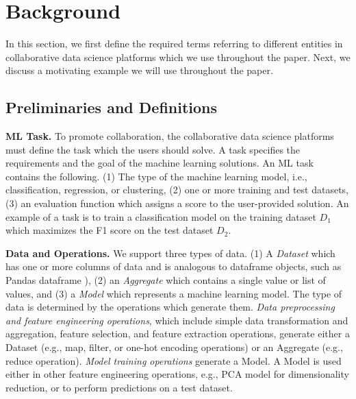 \section{Background} \label{sec-background}
In this section, we first define the required terms referring to different entities in collaborative data science platforms which we use throughout the paper.
Next, we discuss a motivating example we will use throughout the paper.

\subsection{Preliminaries and Definitions}
\textbf{ML Task.} 
To promote collaboration, the collaborative data science platforms must define the task which the users should solve.
A task specifies the requirements and the goal of the machine learning solutions.
An ML task contains the following.
(1) The type of the machine learning model, i.e., classification, regression, or clustering, (2) one or more training and test datasets, (3) an evaluation function which assigns a score to the user-provided solution.
An example of a task is to train a classification model on the training dataset $D_1$ which maximizes the F1 score on the test dataset $D_2$.

\textbf{Data and Operations.}
We support three types of data.
(1) A \textit{Dataset} which has one or more columns of data and is analogous to dataframe objects, such as Pandas dataframe \cite{mckinney-proc-scipy-2010}), (2) an \textit{Aggregate} which contains a single value or list of values, and (3) a \textit{Model} which represents a machine learning model.
The type of data is determined by the operations which generate them.
\textit{Data preprocessing and feature engineering operations}, which include simple data transformation and aggregation, feature selection, and feature extraction operations, generate either a Dataset (e.g., map, filter, or one-hot encoding operations)  or an Aggregate (e.g., reduce operation).
\textit{Model training operations} generate a Model.
A Model is used either in other feature engineering operations, e.g., PCA model for dimensionality reduction, or to perform predictions on a test dataset.
 

